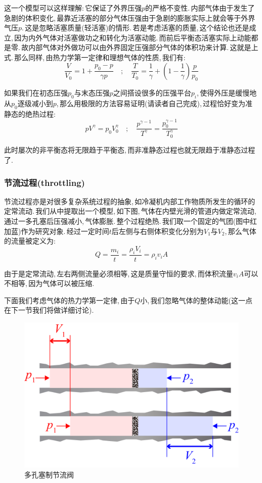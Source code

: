 这一个模型可以这样理解:\,它保证了外界压强$p$的严格不变性.\,内部气体由于发生了急剧的体积变化,\,最靠近活塞的部分气体压强由于急剧的膨胀实际上就会等于外界气压$p$.\,这是忽略活塞质量(轻活塞)的情形.\,若是考虑活塞的质量,\,这个结论也还是成立,\,因为内外气体对活塞做功之和转化为活塞动能.\,而前后平衡态活塞实际上动能都是零.\,故内部气体对外做功可以由外界固定压强部分气体的体积功来计算.\,这就是上式.\,那么同样,\,由热力学第一定律和理想气体的性质,\,我们有:
\[\frac{V}{V_0}=1+\frac{p_0-p}{\gamma p} \quad ; \quad \frac{T}{T_0}=\frac{1}{\gamma}+(1-\frac{1}{\gamma})\frac{p}{p_0}\]

如果我们在初态压强$p_0$与末态压强$p$之间搭设很多的压强平台$p_i$,\,使得外压是缓慢地从$p_0$逐级减小到$p$,\,那么用极限的方法容易证明(请读者自己完成),\,过程恰好变为准静态的绝热过程:
\[pV^\gamma=p_0V_0^\gamma \quad ; \quad \frac{p^{\gamma-1}}{T^\gamma}=\frac{p_0^{\gamma-1}}{T_0^\gamma}\]

此时屡次的非平衡态将无限趋于平衡态,\,而非准静态过程也就无限趋于准静态过程了.

\npg{-2cm}

\subsubsection{\hei 节流过程(throttling)}
节流过程亦是对很多复杂系统过程的抽象,\,如冷凝机内部工作物质所发生的循环的定常流动.\,我们从中提取出一个模型,\,如下图,\,气体在内壁光滑的管道内做定常流动,\,通过一多孔塞后压强减小,\,气体膨胀.\,整个过程绝热.\,我们取一个固定的气团(图中红加蓝)作为研究对象.\,经过一定时间$t$后左侧与右侧体积变化分别为$V_1$与$V_2$,\,那么气体的流量被定义为:
\[Q=\frac{m_i}{t}=\frac{\rho_i V_i}{t}=\rho_i v_i A\]

由于是定常流动,\,左右两侧流量必须相等,\,这是质量守恒的要求,\,而体积流量$v_i A$可以不相等,\,因为气体可以被压缩.

下面我们考虑气体的热力学第一定律,\,由于$Q$小,\,我们忽略气体的整体动能(这一点在下一节我们将做详细讨论).\,
\begin{figure}[H]
\centering
\includegraphics[width=14cm]{image/5-1-9.png}
\caption{多孔塞制节流阀}
\end{figure}

